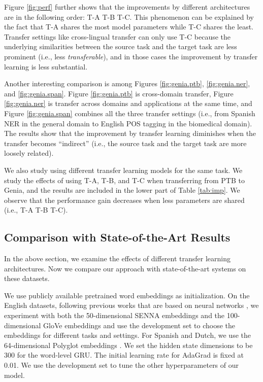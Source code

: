 \documentclass{article} \usepackage{iclr2017_conference,times}
\begin{document}
Figure \ref{fig:perf} further shows that the improvements by different architectures are in the following order: T-A  T-B  T-C. This phenomenon can be explained by the fact that T-A shares the most model parameters while T-C shares the least. 
Transfer settings like cross-lingual transfer can only use T-C because the underlying similarities between the source task and the target task are less prominent (i.e., less \textit{transferable}), and in those cases the improvement by transfer learning is less substantial.

Another interesting comparison is among Figures \ref{fig:genia.ptb}, \ref{fig:genia.ner}, and \ref{fig:genia.span}. Figure \ref{fig:genia.ptb} is cross-domain transfer, Figure \ref{fig:genia.ner} is transfer across domains and applications at the same time, and Figure \ref{fig:genia.span} combines all the three transfer settings (i.e., from Spanish NER in the general domain to English POS tagging in the biomedical domain). The results show that the improvement by transfer learning diminishes when the transfer becomes ``indirect'' (i.e., the source task and the target task are more loosely related).

We also study using different transfer learning models for the same task. We study the effects of using T-A, T-B, and T-C when transferring from PTB to Genia, and the results are included in the lower part of Table \ref{tab:imp}. We observe that the performance gain decreases when less parameters are shared (i.e., T-A  T-B  T-C).

\subsection{Comparison with State-of-the-Art Results}

In the above section, we examine the effects of different transfer learning architectures. Now we compare our approach with state-of-the-art systems on these datasets.

We use publicly available pretrained word embeddings as initialization. On the English datasets, following previous works that are based on neural networks \citep{collobert2011natural,huang2015bidirectional,chiu2015named,ma2016end}, we experiment with both the 50-dimensional SENNA embeddings \citep{collobert2011natural} and the 100-dimensional GloVe embeddings \citep{pennington2014glove} and use the development set to choose the embeddings for different tasks and settings. For Spanish and Dutch, we use the 64-dimensional Polyglot embeddings \citep{al2013polyglot}. We set the hidden state dimensions to be 300 for the word-level GRU. The initial learning rate for AdaGrad is fixed at 0.01. We use the development set to tune the other hyperparameters of our model. 
\end{document}
